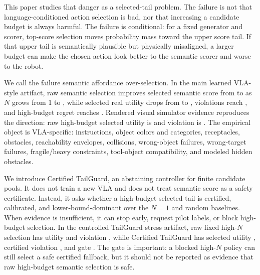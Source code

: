 \documentclass{article}
\newcommand{\method}{Certified TailGuard}
\newcommand{\sao}{semantic affordance over-selection}
\begin{document}
This paper studies that danger as a selected-tail problem. The failure is not that language-conditioned action selection is bad, nor that increasing a candidate budget is always harmful. The failure is conditional: for a fixed generator and scorer, top-score selection moves probability mass toward the upper score tail. If that upper tail is semantically plausible but physically misaligned, a larger budget can make the chosen action look better to the semantic scorer and worse to the robot.

We call the failure \sao{}. In the main learned VLA-style artifact, raw semantic selection improves selected semantic score from \VThreeLearnedRawNOneSem{} to \VThreeLearnedRawHighSem{} as $N$ grows from 1 to \VThreeCandidateBudget{}, while selected real utility drops from \VThreeLearnedRawNOneUtil{} to \VThreeLearnedRawHighUtil{}, violations reach \VThreeLearnedRawHighViol{}, and high-budget regret reaches \VThreeLearnedRawRegret{}. Rendered visual simulator evidence reproduces the direction: raw high-budget selected utility is \VThreeRenderedRawHighUtil{} and violation is \VThreeRenderedRawHighViol{}. The empirical object is VLA-specific: instructions, object colors and categories, receptacles, obstacles, reachability envelopes, collisions, wrong-object failures, wrong-target failures, fragile/heavy constraints, tool-object compatibility, and modeled hidden obstacles.

We introduce \method{}, an abstaining controller for finite candidate pools. It does not train a new VLA and does not treat semantic score as a safety certificate. Instead, it asks whether a high-budget selected tail is certified, calibrated, and lower-bound-dominant over the $N=1$ and random baselines. When evidence is insufficient, it can stop early, request pilot labels, or block high-budget selection. In the controlled TailGuard stress artifact, raw fixed high-$N$ selection has utility \VThreeTailGuardRawUtil{} and violation \VThreeTailGuardRawViol{}, while \method{} has selected utility \VThreeTailGuardUtil{}, certified violation \VThreeTailGuardViol{}, and gate \texttt{\VThreeTailGuardGate{}}. The gate is important: a blocked high-$N$ policy can still select a safe certified fallback, but it should not be reported as evidence that raw high-budget semantic selection is safe.
\end{document}
